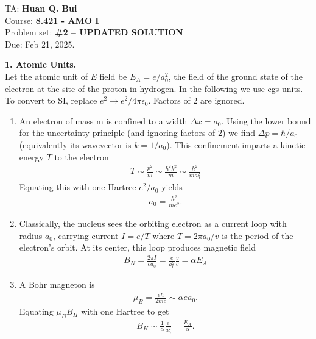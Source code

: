 \documentclass{article}
\theoremstyle{definition}
\newcommand{\al}{\alpha}
\begin{document}
\begin{framed}
\noindent TA: \textbf{Huan Q. Bui}\\
Course: \textbf{8.421 - AMO I}\\
Problem set: \textbf{\#2 -- UPDATED SOLUTION}\\
Due: Feb 21, 2025.
\end{framed}
	
	

\noindent \textbf{1. Atomic Units.}\\

\noindent Let the atomic unit of $E$ field be $E_A = e/a_0^2$, the field of the ground state of the electron at the site of the proton in hydrogen. In the following we use cgs units. To convert to SI, replace $e^2 \to e^2/4\pi\epsilon_0$. Factors of 2 are ignored.
\begin{enumerate}[label=\alph*)]
	\item An electron of mass m is confined to a width $\Delta x = a_0$. Using the lower bound for the uncertainty principle (and ignoring factors of 2) we find $\Delta p = \hbar / a_0$ (equivalently its wavevector is $k = 1/a_0$). This confinement imparts a kinetic energy $T$ to the electron	
	\begin{align*}
		T \sim \frac{p^2}{m} \sim \frac{\hbar^2 k^2}{m} \sim \frac{\hbar^2}{m a_0^2}
	\end{align*}
	Equating this with one Hartree $e^2/a_0$ yields
	\begin{align*}
	a_0 = \frac{\hbar^2}{me^2}.
	\end{align*}
	
	\item Classically, the nucleus sees the orbiting electron as a current loop with radius $a_0$,
carrying current $I = e/T$ where $T = 2\pi a_0/v$ is the period of the electron's orbit. At
its center, this loop produces magnetic field
	\begin{align*}
	B_N = \frac{2\pi I}{ca_0} = \frac{e}{a_0^2}\frac{v}{c} = \al E_A
	\end{align*}
	
	\item A Bohr magneton is
	\begin{align*}
	\mu_B = \frac{e\hbar}{2mc}  \sim \alpha ea_0.
	\end{align*}
	Equating $\mu_B B_H$ with one Hartree to get
	\begin{align*}
	B_H \sim \frac{1}{\alpha}\frac{e}{a_0^2} = \frac{E_A}{\al}.
	\end{align*}
	

\end{enumerate}
\end{document}
